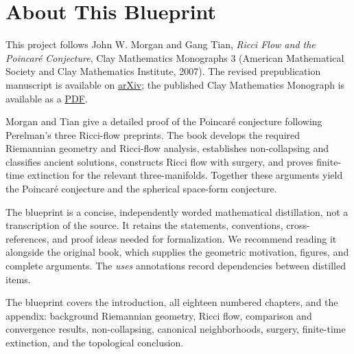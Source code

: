 


\chapter*{About This Blueprint}

This project follows John W. Morgan and Gang Tian, \emph{Ricci Flow and the
Poincar\'e Conjecture}, Clay Mathematics Monographs 3 (American Mathematical
Society and Clay Mathematics Institute, 2007). The revised prepublication
manuscript is available on
\href{https://arxiv.org/pdf/math/0607607}{arXiv}; the published Clay
Mathematics Monograph is available as a
\href{https://www.claymath.org/library/monographs/cmim03.pdf}{PDF}.

Morgan and Tian give a detailed proof of the Poincar\'e conjecture following
Perelman's three Ricci-flow preprints. The book develops the required
Riemannian geometry and Ricci-flow analysis, establishes non-collapsing and
classifies ancient solutions, constructs Ricci flow with surgery, and proves
finite-time extinction for the relevant three-manifolds. Together these
arguments yield the Poincar\'e conjecture and the spherical space-form
conjecture.

The blueprint is a concise, independently worded mathematical distillation,
not a transcription of the source. It retains the statements, conventions,
cross-references, and proof ideas needed for formalization. We recommend
reading it alongside the original book, which supplies the geometric
motivation, figures, and complete arguments. The \emph{uses} annotations
record dependencies between distilled items.

The blueprint covers the introduction, all eighteen numbered chapters, and
the appendix: background Riemannian geometry, Ricci flow, comparison and
convergence results, non-collapsing, canonical neighborhoods, surgery,
finite-time extinction, and the topological conclusion.






















